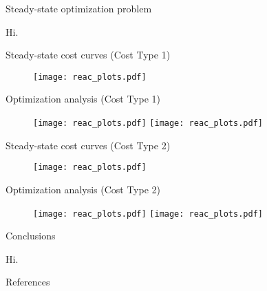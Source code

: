 \documentclass[xcolor=dvipsnames, 8pt]{beamer} %
\begin{document}
\begin{frame}{Steady-state optimization problem}

	Hi.

\end{frame}

\begin{frame}{Steady-state cost curves (Cost Type 1)}

\begin{figure}
	\centering
	\texttt{[image: reac\_plots.pdf]}
\end{figure}

\end{frame}

\begin{frame}{Optimization analysis (Cost Type 1)}

\begin{figure}
	\centering
	\texttt{[image: reac\_plots.pdf]}
	\texttt{[image: reac\_plots.pdf]}
\end{figure}


\end{frame}

\begin{frame}{Steady-state cost curves (Cost Type 2)}

	\begin{figure}
		\centering
		\texttt{[image: reac\_plots.pdf]}
	\end{figure}

\end{frame}

\begin{frame}{Optimization analysis (Cost Type 2)}

\begin{figure}
	\centering
	\texttt{[image: reac\_plots.pdf]}
	\texttt{[image: reac\_plots.pdf]}
\end{figure}

\end{frame}

\begin{frame}{Conclusions}

	Hi.

\end{frame}

\begin{frame}{References}


\end{frame}
\end{document}
